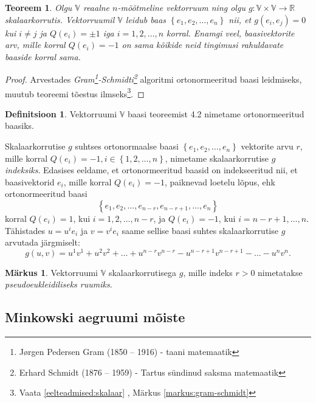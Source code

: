 \documentclass[a4paper,12pt]{article}
\theoremstyle{plain}
\newtheorem{teoreem}{Teoreem}[section]
\theoremstyle{definition}
\newtheorem{definitsioon}{Definitsioon}[section]
\newtheorem{markus}{Märkus}[section]
\numberwithin{equation}{section}
\begin{document}
\begin{teoreem}
Olgu $\mathbb{V}$ reaalne $n$-mõõtmeline vektorruum ning olgu $g : \mathbb{V} \times \mathbb{V} \rightarrow \mathbb{R}$ skalaarkorrutis. Vektorruumil $\mathbb{V}$ leidub baas $\left\lbrace e_1, e_2, \dots, e_n \right\rbrace$ nii, et $g \left(e_i, e_j\right) = 0$ kui $i \neq j$ ja $Q\left(e_i\right) = \pm 1$ iga $i = 1, 2, \dots, n$ korral. Enamgi veel, baasivektorite arv, mille korral $Q \left(e_i\right) = -1$ on sama kõikide neid tingimusi rahuldavate baaside korral sama.
\end{teoreem}

\begin{proof}
Arvestades \textit{Gram\footnote{Jørgen Pedersen Gram (1850 – 1916) - taani matemaatik}-Schmidti\footnote{Erhard Schmidt (1876 – 1959) - Tartus sündinud saksma matemaatik}} algoritmi ortonormeeritud baasi leidmiseks, muutub teoreemi tõestus ilmseks\footnote{Vaata \ref{eelteadmised:skalaar} , Märkus \ref{markus:gram-schmidt}}.
\end{proof}

\begin{definitsioon}
Vektorruumi $\mathbb{V}$ baasi teoreemist 4.2 nimetame ortonormeeritud baasiks.
\end{definitsioon}

Skalaarkorrutise $g$ suhtses ortonormaalse baasi $\left\lbrace e_1, e_2, \dots, e_n \right\rbrace$ vektorite arvu $r$, mille korral $Q \left(e_i\right) = -1, i \in \left\lbrace 1, 2, \dots, n \right\rbrace$, nimetame skalaarkorrutise $g$ \emph{indeksiks}.
Edasises eeldame, et ortonormeeritud baasid on indekseeritud nii, et baasivektorid $e_i$, mille korral $Q \left(e_i\right) = -1$, paiknevad loetelu lõpus, ehk ortonormeeritud baasi 
\[\left\lbrace e_1, e_2, \dots, e_{n-r}, e_{n-r+1}, \dots, e_n \right\rbrace\]
korral $Q \left(e_i\right) = 1$, kui $i = 1, 2, \dots, n-r$, ja $Q \left(e_i\right) = -1$, kui $i = n-r+1, \dots, n$. Tähistades $u = u^i e_i$ ja $v = v^i e_i$ saame sellise baasi suhtes skalaarkorrutise $g$ arvutada järgmiselt:
\[g\left(u, v\right) = u^1 v^1 + u^2 v^2 + \dots + u^{n-r} v^{n-r} - u^{n-r+1} v^{n-r+1} - \dots - u^n v^n.\]

\begin{markus}
Vektorruumi $\mathbb{V}$ skalaarkorrutisega $g$, mille indeks $r > 0$ nimetatakse \emph{pseudoeukleidiliseks ruumiks}.
\end{markus}


\subsection{Minkowski aegruumi mõiste}
\end{document}
